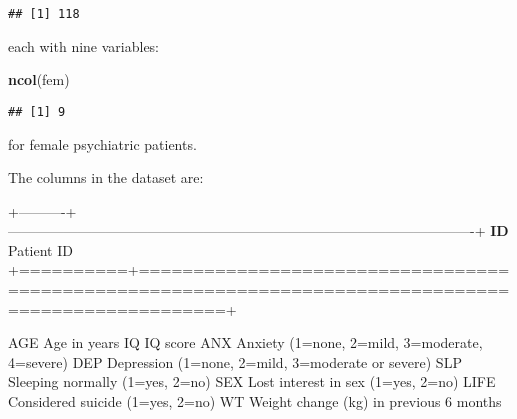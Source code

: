 \documentclass[]{book}
\newenvironment{Shaded}{\begin{snugshade}}{\end{snugshade}}
\newcommand{\KeywordTok}[1]{\textcolor[rgb]{0.13,0.29,0.53}{\textbf{#1}}}
\newcommand{\NormalTok}[1]{#1}
\theoremstyle{definition}
\theoremstyle{definition}
\theoremstyle{definition}
\theoremstyle{remark}
\begin{document}
\begin{verbatim}
## [1] 118
\end{verbatim}

each with nine variables:

\begin{Shaded}
\begin{Highlighting}[]
\KeywordTok{ncol}\NormalTok{(fem)}
\end{Highlighting}
\end{Shaded}

\begin{verbatim}
## [1] 9
\end{verbatim}

for female psychiatric patients.

The columns in the dataset are:

+----------+----------------------------------------------------------------------------------------------------+
\textbar{} \textbf{ID} \textbar{} Patient ID \textbar{}
+==========+====================================================================================================+

AGE Age in years IQ IQ score ANX Anxiety (1=none, 2=mild, 3=moderate,
4=severe) DEP Depression (1=none, 2=mild, 3=moderate or severe) SLP
Sleeping normally (1=yes, 2=no) SEX Lost interest in sex (1=yes, 2=no)
LIFE Considered suicide (1=yes, 2=no) WT Weight change (kg) in previous
6 months


\end{document}
